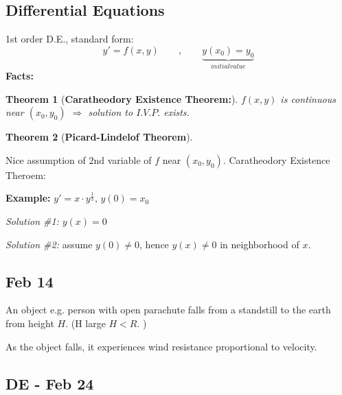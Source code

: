 \documentclass[12pt]{article}
\theoremstyle{plain}
\newtheorem{theorem}{Theorem}[subsection]
\begin{document}
	\subsection{Differential Equations}
	1st order D.E., standard form: 
	\[
		y' = f(x,y) \qquad , \qquad \underbrace{y(x_0) = y_0}_{initial
		value}
	\]
	\textbf{Facts:} 
	\begin{theorem}[\textbf{Caratheodory Existence Theorem:}]
		$f(x,y)$ is continuous near $(x_0, y_0)$ $\Rightarrow$ solution to
		$I.V.P.$ exists. 
	\end{theorem}
	\begin{theorem}[\textbf{Picard-Lindelof Theorem}]
	\end{theorem}
	Nice assumption of $2$nd variable of $f$ near $(x_0, y_0)$. 
	Caratheodory Existence Theroem: 

	{\color{Brown}
	\textbf{Example: }
	$y' = x \cdot y^{\frac 13}$, $y(0)=x_0$

	\textit{Solution \#1:} $y(x) = 0$ 
	
	\textit{Solution \#2:} assume $y(0)\neq 0$, hence $y(x)\neq 0$ in 
	neighborhood of $x$. 
	}



	\newpage
	\subsection{Feb 14}
	An object e.g. person with open parachute falls from a standstill to the 
	earth from height $H$.  (H large $H < R$. ) 

	As the object falls, it experiences wind resistance proportional to
	velocity. 

	



	\newpage
	\subsection{DE - Feb 24}
\end{document}
